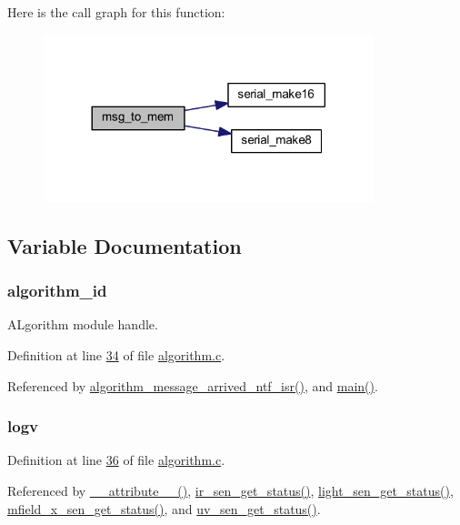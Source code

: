 Here is the call graph for this function\+:\nopagebreak
\begin{figure}[H]
\begin{center}
\leavevmode
\includegraphics[width=272pt]{de/d11/a00021_a126f3d78a95341a19a3e862e57357952_cgraph}
\end{center}
\end{figure}




\subsection{Variable Documentation}
\hypertarget{a00021_aff3e3d622fcd96787628167d3c1856f9}{
\subsubsection[{algorithm\+\_\+id}]{ algorithm\+\_\+id}}\label{a00021_aff3e3d622fcd96787628167d3c1856f9}


A\+Lgorithm module handle. 



Definition at line \hyperlink{a00038_source_l00034}{34} of file \hyperlink{a00038_source}{algorithm.\+c}.



Referenced by \hyperlink{a00038_source_l02104}{algorithm\+\_\+message\+\_\+arrived\+\_\+ntf\+\_\+isr()}, and \hyperlink{a00048_source_l00080}{main()}.

\hypertarget{a00021_a2e89c46668b39a17753c238950c9e1ec}{
\subsubsection[{logv}]{ logv}}\label{a00021_a2e89c46668b39a17753c238950c9e1ec}


Definition at line \hyperlink{a00038_source_l00036}{36} of file \hyperlink{a00038_source}{algorithm.\+c}.



Referenced by \hyperlink{a00041_source_l00025}{\+\_\+\+\_\+attribute\+\_\+\+\_\+()}, \hyperlink{a00045_source_l00302}{ir\+\_\+sen\+\_\+get\+\_\+status()}, \hyperlink{a00047_source_l00204}{light\+\_\+sen\+\_\+get\+\_\+status()}, \hyperlink{a00050_source_l00276}{mfield\+\_\+x\+\_\+sen\+\_\+get\+\_\+status()}, and \hyperlink{a00073_source_l00302}{uv\+\_\+sen\+\_\+get\+\_\+status()}.

